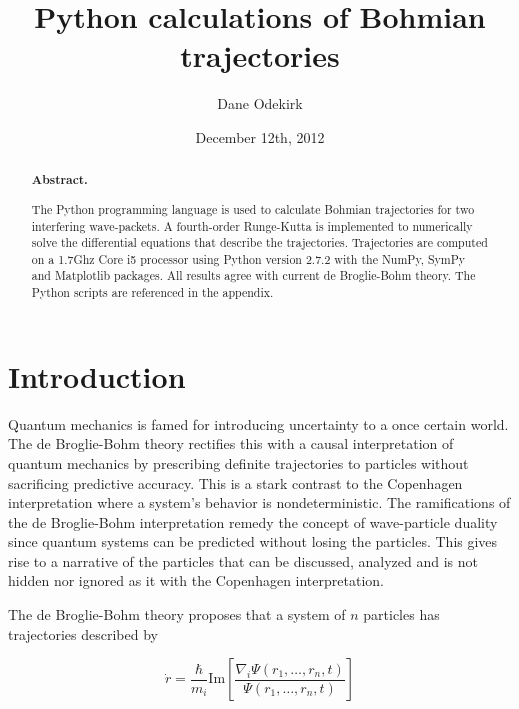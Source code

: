 \documentclass[10pt, reqno]{article}
\title{Python calculations of Bohmian trajectories}
\author{Dane Odekirk}
\date{December 12th, 2012}
\begin{document}
 
\maketitle 
\pagebreak

\begin{abstract}
  \noindent 
  {\bf Abstract. } 

  The Python programming language is used to calculate Bohmian trajectories for two interfering wave-packets. 
  A fourth-order Runge-Kutta is implemented to numerically solve the differential equations that describe the trajectories.
  Trajectories are computed on a 1.7Ghz Core i5 processor using Python version 2.7.2 with the NumPy, SymPy and Matplotlib packages.
  All results agree with current de Broglie-Bohm theory.
  The Python scripts are referenced in the appendix.

\end{abstract}




\section{Introduction}

  Quantum mechanics is famed for introducing uncertainty to a once certain world.
  The de Broglie-Bohm theory rectifies this with a causal interpretation of quantum mechanics by 
    prescribing definite trajectories to particles without sacrificing predictive accuracy.
  This is a stark contrast to the Copenhagen interpretation where a system's behavior is nondeterministic.  
  The ramifications of the de Broglie-Bohm interpretation remedy the concept of wave-particle duality since
    quantum systems can be predicted without losing the particles.
  This gives rise to a narrative of the particles that can be discussed, analyzed and is not hidden nor ignored as it with 
    the Copenhagen interpretation.

  The de Broglie-Bohm theory proposes that a system of $n$ particles has trajectories described by 

  \begin{equation} \label{eq:trajectories}
    \dot{r} = \frac{\hbar}{m_i}\text{Im}[\frac{ \nabla_{i} \Psi(r_1,\dots,r_n,t)}{\Psi(r_1, \dots, r_n, t) } ]
  \end{equation}
\end{document}
